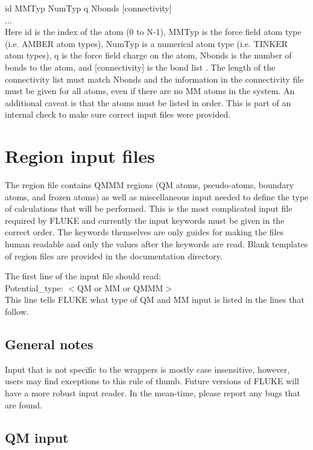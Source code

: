 \documentclass[12pt]{report}
\begin{document}
id MMTyp NumTyp q Nbonds [connectivity] \\
... \\

Here id is the index of the atom (0 to N-1), MMTyp is the force field atom
type (i.e. AMBER atom types), NumTyp is a numerical atom type (i.e. TINKER
atom types), q is the force field charge on the atom, Nbonds is the number of
bonds to the atom, and [connectivity] is the bond list . The length of the
connectivity list must match Nbonds and the information in the connectivity
file must be given for all atoms, even if there are no MM atoms in the system.
An additional caveat is that the atoms must be listed in order. This is part
of an internal check to make sure correct input files were provided.

\section{Region input files}

The region file contains QMMM regions (QM atoms, pseudo-atoms, boundary atoms,
and frozen atoms) as well as miscellaneous input needed to define the type
of calculations that will be performed. This is the most complicated input
file required by FLUKE and currently the input keywords must be given in the
correct order. The keywords themselves are only guides for making the files
human readable and only the values after the keywords are read. Blank templates
of region files are provided in the documentation directory.

The first line of the input file should read: \\

Potential\_type: $<$QM or MM or QMMM$>$ \\

This line tells FLUKE what type of QM and MM input is listed in the lines that
follow.

\subsection{General notes}

Input that is not specific to the wrappers is mostly case insensitive,
however, users may find exceptions to this rule of thumb. Future versions of
FLUKE will have a more robust input reader. In the mean-time, please report
any bugs that are found.

\subsection{QM input}
\end{document}
